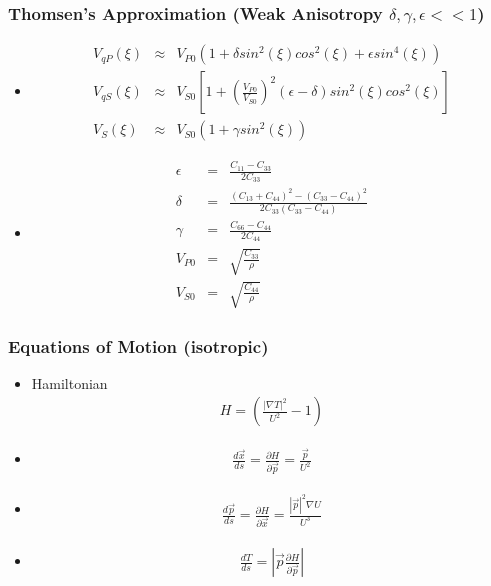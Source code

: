 \documentclass{beamer}
\begin{document}
\begin{frame}
\frametitle{Thomsen's Approximation (Weak Anisotropy $\delta,\gamma,\epsilon << 1$)}

\fontsize{6pt}{7.2}\selectfont

\begin{itemize}

\pause \item
\begin{eqnarray}
V_{qP}(\xi) &\approx& V_{P0} (1 + \delta sin^2(\xi)cos^2(\xi) + \epsilon sin^4(\xi))\nonumber \\
V_{qS}(\xi) &\approx& V_{S0} \left[ 1 + \left(\frac{V_{P0}}{V_{S0}}\right)^2 (\epsilon-\delta)sin^2(\xi)cos^2(\xi) \right]\nonumber \\
V_{S}(\xi)  &\approx& V_{S0} (1 + \gamma sin^2(\xi))\nonumber
\end{eqnarray}

\pause \item
\begin{eqnarray}
\epsilon &=& \frac{C_{11}-C_{33}}{2C_{33}} \nonumber \\
\delta &=& \frac{(C_{13}+C_{44})^2-(C_{33}-C_{44})^2}{2C_{33}(C_{33}-C_{44})} \nonumber \\
\gamma &=& \frac{C_{66}-C_{44}}{2C_{44}} \nonumber \\
V_{P0} &=& \sqrt{\frac{C_{33}}{\rho}} \nonumber \\
V_{S0} &=& \sqrt{\frac{C_{44}}{\rho}} \nonumber 
\end{eqnarray}

\end{itemize}

\end{frame}

\begin{frame}
\frametitle{Equations of Motion (isotropic)}

\begin{itemize}

\pause \item Hamiltonian
\begin{eqnarray}
H = \left( \frac{|\nabla T|^2}{U^2} - 1 \right) \nonumber
\end{eqnarray}

\pause \item 
\begin{eqnarray}
\frac{d\vec{x}}{ds} = \frac{\partial H}{\partial \vec{p}} = \frac{\vec{p}}{U^2} \nonumber
\end{eqnarray}

\pause \item 
\begin{eqnarray}
\frac{d\vec{p}}{ds} = \frac{\partial H}{\partial \vec{x}} = \frac{|\vec{p}|^2\nabla U}{U^3} \nonumber
\end{eqnarray}

\pause \item 
\begin{eqnarray}
\frac{dT}{ds} = |\vec{p} \frac{\partial H}{\partial \vec{p}}| \nonumber
\end{eqnarray}

\end{itemize}

\end{frame}
\end{document}
